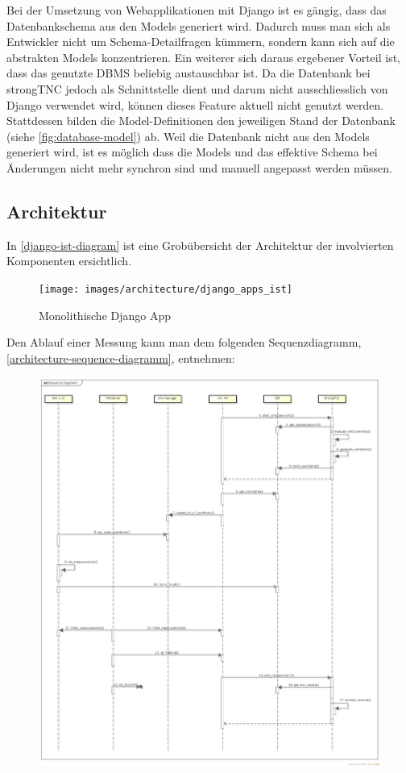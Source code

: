Bei der Umsetzung von Webapplikationen mit Django ist es gängig, dass das
Datenbankschema aus den Models generiert wird. Dadurch muss man sich als
Entwickler nicht um Schema-Detailfragen kümmern, sondern kann sich auf die
abstrakten Models konzentrieren. Ein weiterer sich daraus ergebener Vorteil ist,
dass das genutzte DBMS beliebig austauschbar ist. Da die Datenbank bei strongTNC
jedoch als Schnittstelle dient und darum nicht ausschliesslich von Django
verwendet wird, können dieses Feature aktuell nicht genutzt werden. Stattdessen
bilden die Model-Definitionen den jeweiligen Stand der Datenbank (siehe
\autoref{fig:database-model}) ab. Weil die Datenbank nicht aus den Models
generiert wird, ist es möglich dass die Models und das effektive Schema bei
Änderungen nicht mehr synchron sind und manuell angepasst werden müssen.

\subsection{Architektur}

In \autoref{django-ist-diagram} ist eine Grobübersicht der Architektur der
involvierten Komponenten ersichtlich.

\begin{figure}[H]
	\centering
	\texttt{[image: images/architecture/django\_apps\_ist]}
    \caption{Monolithische Django App}
    \label{django-ist-diagram}
\end{figure}

Den Ablauf einer Messung kann man dem folgenden Sequenzdiagramm,
\autoref{architecture-sequence-diagramm}, entnehmen:
\begin{figure}[H]
	\centering
	\includegraphics[width=\textwidth]{./images/architecture/architecture_sequence_diagramm-2014-03-12}
	\caption{}
	\label{architecture-sequence-diagramm}
\end{figure}

